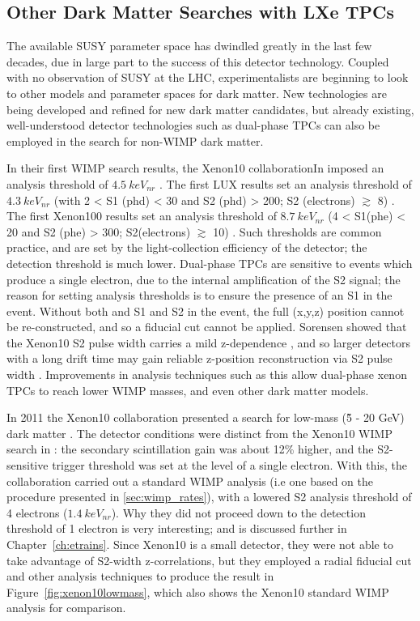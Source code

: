 \subsection{Other Dark Matter Searches with LXe TPCs}
The available \ac{SUSY} parameter space has dwindled greatly in the last few decades, due in large part to the success of this detector technology. Coupled with no observation of \ac{SUSY} at the \ac{LHC}, experimentalists are beginning to look to other models and parameter spaces for dark matter. New technologies are being developed and refined for new dark matter candidates, but already existing, well-understood detector technologies such as dual-phase \ac{TPC}s can also be employed in the search for non-\ac{WIMP} dark matter. 

In their first \ac{WIMP} search results, the Xenon10 collaborationIn imposed an analysis threshold of $4.5~keV_{nr}$ \cite{Xenon10WIMP}. The first \ac{LUX} results set an analysis threshold of $4.3~keV_{nr}$ (with 2 < S1 (phd) < 30 and S2 (phd) > 200; S2 (electrons) $\gtrsim$ 8) \cite{LUXFirstResults}. The first Xenon100 results set an analysis threshold of $8.7~keV_{nr}$ (4 < S1(phe) < 20 and S2 (phe) > 300; S2(electrons) $\gtrsim$ 10) \cite{Xenon100FirstResults}. Such thresholds are common practice, and are set by the light-collection efficiency of the detector; the detection threshold is much lower. Dual-phase \ac{TPC}s are sensitive to events which produce a single electron, due to the internal amplification of the S2 signal; the reason for setting analysis thresholds is to ensure the presence of an S1 in the event. Without both and S1 and S2 in the event, the full (x,y,z) position cannot be re-constructed, and so a fiducial cut cannot be applied. Sorensen showed that the Xenon10 S2 pulse width carries a mild z-dependence \cite{Sorensen2010}, and so larger detectors with a long drift time may gain reliable z-position reconstruction via S2 pulse width \cite{SorensenS2Width}. Improvements in analysis techniques such as this allow dual-phase xenon \ac{TPC}s to reach lower \ac{WIMP} masses, and even other dark matter models. 

In 2011 the Xenon10 collaboration presented a search for low-mass (\~5 - 20 GeV) dark matter \cite{Angle2011}. The detector conditions were distinct from the Xenon10 \ac{WIMP} search in \cite{Xenon10WIMP}: the secondary scintillation gain was about 12\% higher, and the S2-sensitive trigger threshold was set at the level of a single electron. With this, the collaboration carried out a standard \ac{WIMP} analysis (i.e one based on the procedure presented in \ref{sec:wimp_rates}), with a lowered S2 analysis threshold of 4 electrons ($1.4~keV_{nr}$). Why they did not proceed down to the detection threshold of 1 electron is very interesting; and is discussed further in Chapter~\ref{ch:etrains}. Since Xenon10 is a small detector, they were not able to take advantage of S2-width z-correlations, but they employed a radial fiducial cut and other analysis techniques to produce the result in Figure~\ref{fig:xenon10lowmass}, which also shows the Xenon10 standard \ac{WIMP} analysis for comparison.

